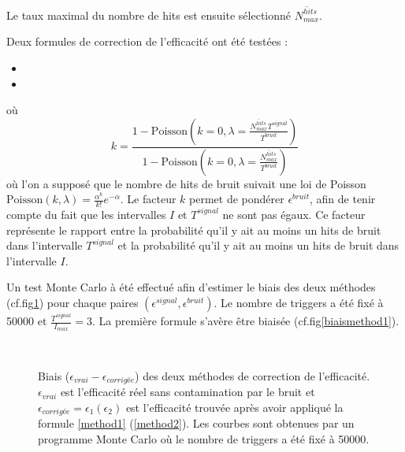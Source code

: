 Le taux maximal du nombre de hits est ensuite sélectionné $\overline{N^{hits}_{max}}$.

Deux formules de correction de l'efficacité ont été testées :
\begin{itemize}[label=$\bullet$]
	\item {}
	\item {}
\end{itemize}
où 
\begin{equation}
k=\frac{1-\mbox{Poisson}\left(k=0,\lambda=\frac{\overline{N^{hits}_{max}}T^{signal}}{T^{bruit}}\right)}{1-\mbox{Poisson}\left(k=0,\lambda=\frac{\overline{N^{hits}_{max}}}{T^{bruit}}\right)}
\end{equation}
où l'on a supposé que le nombre de hits de bruit suivait une loi de Poisson $\mbox{Poisson}\left(k,\lambda\right)=\frac{\alpha^k}{k!}e^{-\alpha}$. Le facteur $k$ permet de pondérer $\epsilon^{bruit}$, afin de tenir compte du fait que les intervalles $I$ et $T^{signal}$ ne sont pas égaux. Ce facteur représente le rapport entre la probabilité qu'il y ait au moins un hits de bruit dans l'intervalle $T^{signal}$ et la probabilité qu'il y ait au moins un hits de bruit dans l'intervalle $I$.

Un test Monte Carlo à été effectué afin d'estimer le biais des deux méthodes (cf.fig\ref{biais}) pour chaque paires $\left(\epsilon^{signal},\epsilon^{bruit}\right)$. Le nombre de triggers a été fixé à \num{50000} et $\frac{T^{signal}}{I_{max}}=3$. La première formule s'avère être biaisée (cf.fig\ref{biaismethod1}).

\tikzexternaldisable
\begin{figure}
\centering
{}
\\
\caption{Biais ($\epsilon_{vrai}-\epsilon_{corrigée}$) des deux méthodes de correction de l'efficacité. $\epsilon_{vrai}$ est l'efficacité réel sans contamination par le bruit et $\epsilon_{corrigée}=\epsilon_{1}(\epsilon_{2})$ est l'efficacité trouvée après avoir appliqué la formule \ref{method1} (\ref{method2}). Les courbes sont obtenues par un programme Monte Carlo où le nombre de triggers a été fixé à \num{50000}.}
\label{biais}
\end{figure}

